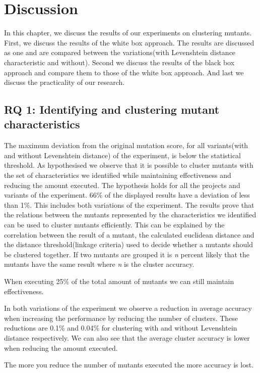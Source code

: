 \documentclass[../main]{subfiles}
\begin{document}
\chapter{Discussion}
\label{ch:discussion}
In this chapter, we discuss the results of our experiments on clustering mutants.
First, we discuss the results of the white box approach. 
The results are discussed as one and are compared between the variations(with Levenshtein distance characteristic and without).
Second we discuss the results of the black box approach and compare them to those of the white box approach.
And last we discuss the practicality of our research.

\section{RQ 1: Identifying and clustering mutant characteristics}
The maximum deviation from the original mutation score, for all variants(with and without Levenshtein distance) of the experiment, is below the statistical threshold.
As hypothesised we observe that it is possible to cluster mutants with the set of characteristics we identified while maintaining effectiveness and reducing the amount executed.
The hypothesis holds for all the projects and variants of the experiment.
66\% of the displayed results have a deviation of less than 1\%. 
This includes both variations of the experiment.
\newline
The results prove that the relations between the mutants represented by the characteristics we identified can be used to cluster mutants efficiently. 
This can be explained by the correlation between the result of a mutant, the calculated euclidean distance and the distance threshold(linkage criteria) used to decide whether a mutants should be clustered together.
\newline
If two mutants are grouped it is \textit{n} percent likely that the mutants have the same result where \textit{n} is the cluster accuracy.
\begin{finding}
    When executing 25\% of the total amount of mutants we can still maintain effectiveness.
\end{finding}
In both variations of the experiment we observe a reduction in average accuracy when increasing the performance by reducing the number of clusters.
These reductions are 0.1\% and 0.04\% for clustering with and without Levenshtein distance respectively.
We can also see that the average cluster accuracy is lower when reducing the amount executed.
\begin{finding}
    The more you reduce the number of mutants executed the more accuracy is lost.
\end{finding}
\end{document}
